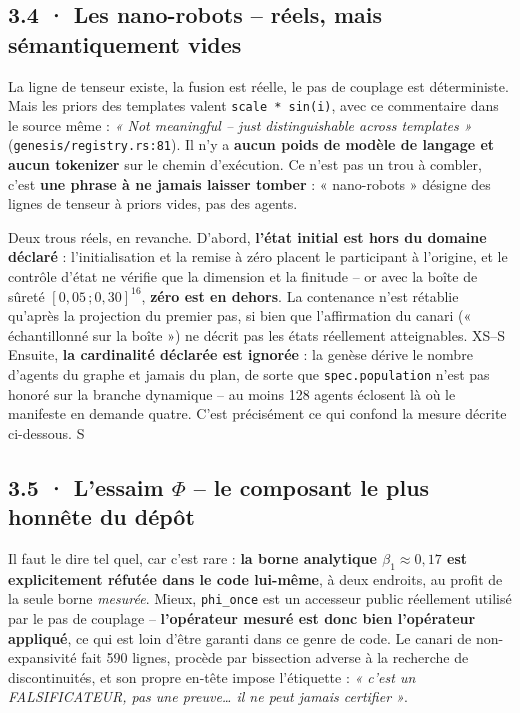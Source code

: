 \documentclass[10pt]{article}
\newcommand{\sz}[1]{{\small\color{grey}\textsf{#1}}}
\newcommand{\code}[1]{\texttt{\small #1}}
\begin{document}
\subsection{3.4 · Les nano-robots -- réels, mais sémantiquement vides}

La ligne de tenseur existe, la fusion est réelle, le pas de couplage est déterministe. Mais les priors
des templates valent \code{scale * sin(i)}, avec ce commentaire dans le source même :
\emph{« Not meaningful -- just distinguishable across templates »} (\code{genesis/registry.rs:81}). Il
n'y a \textbf{aucun poids de modèle de langage et aucun tokenizer} sur le chemin d'exécution. Ce n'est
pas un trou à combler, c'est \textbf{une phrase à ne jamais laisser tomber} : « nano-robots » désigne
des lignes de tenseur à priors vides, pas des agents.

Deux trous réels, en revanche. D'abord, \textbf{l'état initial est hors du domaine déclaré} :
l'initialisation et la remise à zéro placent le participant à l'origine, et le contrôle d'état ne
vérifie que la dimension et la finitude -- or avec la boîte de sûreté $[0{,}05\,;0{,}30]^{16}$,
\textbf{zéro est en dehors}. La contenance n'est rétablie qu'après la projection du premier pas, si bien
que l'affirmation du canari (« échantillonné sur la boîte ») ne décrit pas les états réellement
atteignables. \sz{XS--S} Ensuite, \textbf{la cardinalité déclarée est ignorée} : la genèse dérive le
nombre d'agents du graphe et jamais du plan, de sorte que \code{spec.population} n'est pas honoré sur la
branche dynamique -- au moins 128 agents éclosent là où le manifeste en demande quatre. C'est
précisément ce qui confond la mesure décrite ci-dessous. \sz{S}

\subsection{3.5 · L'essaim $\Phi$ -- le composant le plus honnête du dépôt}

Il faut le dire tel quel, car c'est rare : \textbf{la borne analytique $\beta_1 \approx 0{,}17$ est
explicitement réfutée dans le code lui-même}, à deux endroits, au profit de la seule borne
\emph{mesurée}. Mieux, \code{phi\_once} est un accesseur public réellement utilisé par le pas de
couplage -- \textbf{l'opérateur mesuré est donc bien l'opérateur appliqué}, ce qui est loin d'être
garanti dans ce genre de code. Le canari de non-expansivité fait 590 lignes, procède par bissection
adverse à la recherche de discontinuités, et son propre en-tête impose l'étiquette : \emph{« c'est un
FALSIFICATEUR, pas une preuve\dots{} il ne peut jamais certifier »}.
\end{document}
